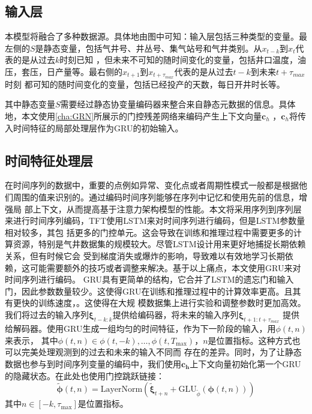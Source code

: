 \subsection{输入层}
本模型将融合了多种数据源。具体地由图中可知：输入层包括三种类型的变量。最左侧的$S$是静态变量，包括气井号、井丛号、集气站号和气井类别。从$x_{t-k}$到$x_t$代表的是从过去$k$时刻已知
，但未来不可知的随时间变化的变量，包括井口温度，油压，套压，日产量等。最右侧的$x_{t+1}$到$x_{t+\tau_{max}} $代表的是从过去$t-k$到未来$t+\tau_{max}$时刻
都可知的随时间变化的变量，包括已经投产的天数，每日开井时长等。

其中静态变量$S$需要经过静态协变量编码器来整合来自静态元数据的信息。具体地，本文使用\ref{cha:GRN}所展示的门控残差网络来编码产生上下文向量$\mathbf{c}_h$
，$\mathbf{c}_h$将传入时间特征的局部处理层作为GRU的初始输入。
\subsection{时间特征处理层}
在时间序列的数据中，重要的点例如异常、变化点或者周期性模式一般都是根据他们周围的值来识别的。通过编码时间序列能够在序列中记忆和使用先前的信息，增强局
部上下文，从而提高基于注意力架构模型的性能。本文将采用序列到序列层来进行时间序列编码，TFT使用LSTM来对时间序列进行编码，但是LSTM参数量相对较多，其包
括更多的门控单元。这会导致在训练和推理过程中需要更多的计算资源，特别是气井数据集的规模较大。尽管LSTM设计用来更好地捕捉长期依赖关系，但有时候它会
受到梯度消失或爆炸的影响，导致难以有效地学习长期依赖，这可能需要额外的技巧或者调整来解决。基于以上痛点，本文使用GRU来对时间序列进行编码。
GRU具有更简单的结构，它合并了LSTM的遗忘门和输入门，因此参数数量较少。这使得GRU在训练和推理过程中的计算效率更高。且其有更快的训练速度，。这使得在大规
模数据集上进行实验和调整参数时更加高效。我们将过去的输入序列$\bm{\xi}_{t-k:k}$提供给编码器，将未来的输入序列$\bm{\xi}_{t+1:t+\tau_{max}}$
提供给解码器。使用GRU生成一组均匀的时间特征，作为下一阶段的输入，用$\phi (t,n)$来表示，
其中$\phi(t,n) \in {\phi(t, -k), \ldots, \phi(t, T_{\text{max}})}$，$n$是位置指标。这种方式也可以完美处理观测到的过去和未来的输入不同而
存在的差异。同时，为了让静态数据也参与到时间序列变量的编码中，我们使用$\mathbf{c_h}$上下文向量初始化第一个GRU的隐藏状态。在此处也使用门控跳跃链接：
\begin{equation}
    \tilde{\bm{\phi}}(t, n) = \text{LayerNorm}\left(\tilde{\bm{\xi}}_{t+n} + \text{GLU}_{\tilde{\phi}}(\bm{\phi}(t, n))\right)
\end{equation}
其中$n \in [ -k, \tau_{\max}]$是位置指标。
